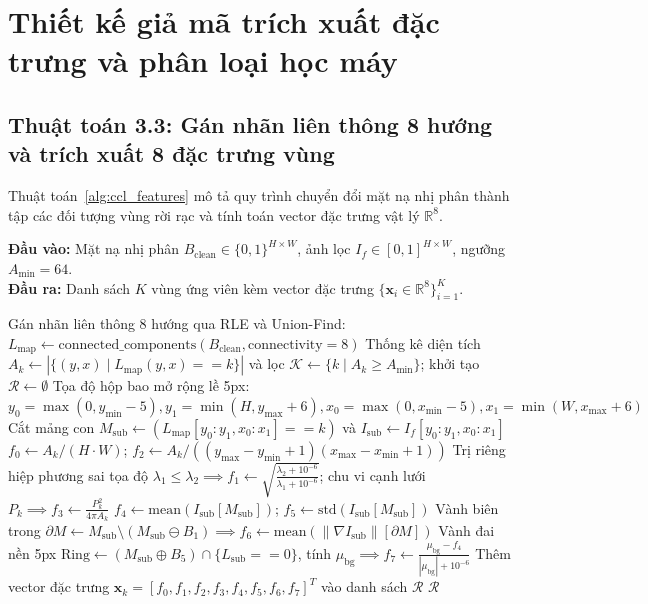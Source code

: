 \section{Thiết kế giả mã trích xuất đặc trưng và phân loại học máy}
\label{sec:thuat_toan_vung_phan_loai}

\subsection{Thuật toán 3.3: Gán nhãn liên thông 8 hướng và trích xuất 8 đặc trưng vùng}

Thuật toán~\ref{alg:ccl_features} mô tả quy trình chuyển đổi mặt nạ nhị phân thành tập các đối tượng vùng rời rạc và tính toán vector đặc trưng vật lý $\mathbb{R}^8$.

\begin{algorithm}[!htbp]
\small{}
\caption{Gán nhãn liên thông 8 hướng và trích xuất đặc trưng vùng theo hộp bao cục bộ}
\label{alg:ccl_features}
\textbf{Đầu vào:} Mặt nạ nhị phân $B_{\text{clean}} \in \{0, 1\}^{H \times W}$, ảnh lọc $I_f \in [0, 1]^{H \times W}$, ngưỡng $A_{\min} = 64$. \\
\textbf{Đầu ra:} Danh sách $K$ vùng ứng viên kèm vector đặc trưng $\{\mathbf{x}_i \in \mathbb{R}^8\}_{i=1}^K$.
\begin{algorithmic}[1]
\STATE Gán nhãn liên thông 8 hướng qua RLE và Union-Find: $L_{\text{map}} \leftarrow \text{connected\_components}(B_{\text{clean}}, \text{connectivity}=8)$
\STATE Thống kê diện tích $A_k \leftarrow |\{(y, x) \mid L_{\text{map}}(y, x) == k\}|$ và lọc $\mathcal{K} \leftarrow \{k \mid A_k \ge A_{\min}\}$; khởi tạo $\mathcal{R} \leftarrow \emptyset$
    \STATE Tọa độ hộp bao mở rộng lề 5px: $y_0 = \max(0, y_{\min}-5), y_1 = \min(H, y_{\max}+6), x_0 = \max(0, x_{\min}-5), x_1 = \min(W, x_{\max}+6)$
    \STATE Cắt mảng con $M_{\text{sub}} \leftarrow (L_{\text{map}}[y_0:y_1, x_0:x_1] == k)$ và $I_{\text{sub}} \leftarrow I_f[y_0:y_1, x_0:x_1]$
    \STATE $f_0 \leftarrow A_k / (H \cdot W)$; $f_2 \leftarrow A_k / ((y_{\max} - y_{\min} + 1)(x_{\max} - x_{\min} + 1))$
    \STATE Trị riêng hiệp phương sai tọa độ $\lambda_1 \le \lambda_2 \implies f_1 \leftarrow \sqrt{\frac{\lambda_2 + 10^{-6}}{\lambda_1 + 10^{-6}}}$; chu vi cạnh lưới $P_k \implies f_3 \leftarrow \frac{P_k^2}{4\pi A_k}$
    \STATE $f_4 \leftarrow \text{mean}(I_{\text{sub}}[M_{\text{sub}}])$; $f_5 \leftarrow \text{std}(I_{\text{sub}}[M_{\text{sub}}])$
    \STATE Vành biên trong $\partial M \leftarrow M_{\text{sub}} \setminus (M_{\text{sub}} \ominus B_1) \implies f_6 \leftarrow \text{mean}(\|\nabla I_{\text{sub}}\|[\partial M])$
    \STATE Vành đai nền 5px $\text{Ring} \leftarrow (M_{\text{sub}} \oplus B_5) \cap \{L_{\text{sub}} == 0\}$, tính $\mu_{\text{bg}} \implies f_7 \leftarrow \frac{\mu_{\text{bg}} - f_4}{|\mu_{\text{bg}}| + 10^{-6}}$
    \STATE Thêm vector đặc trưng $\mathbf{x}_k = [f_0, f_1, f_2, f_3, f_4, f_5, f_6, f_7]^T$ vào danh sách $\mathcal{R}$
\ENDFOR
\RETURN $\mathcal{R}$
\end{algorithmic}
\end{algorithm}

